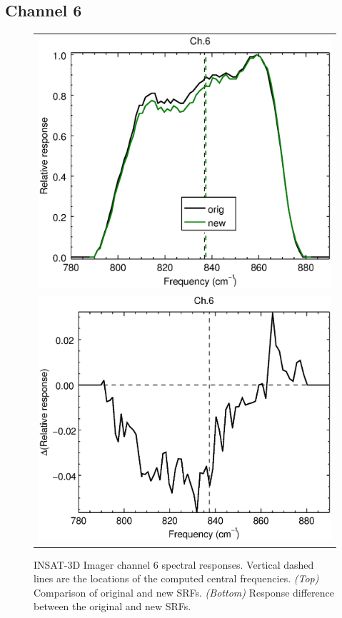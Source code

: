 \subsection{Channel 6}
\begin{figure}[H]
  \centering
  \begin{tabular}{c}
    \includegraphics[scale=0.55]{graphics/imgr/srf/imgr_insat3d-6.eps} \\
    \includegraphics[scale=0.55]{graphics/imgr/srf/imgr_insat3d-6.difference.eps}
  \end{tabular}
  \caption{INSAT-3D Imager channel 6 spectral responses. Vertical dashed lines are the locations of the computed central frequencies. \emph{(Top)} Comparison of original and new SRFs. \emph{(Bottom)} Response difference between the original and new SRFs.}
  \label{fig:imgr_ch6}
\end{figure}
